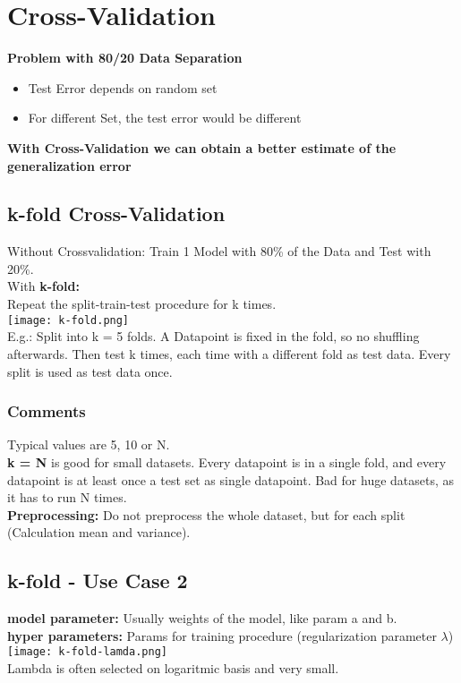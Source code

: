 \section{Cross-Validation}
\textbf{Problem with 80/20 Data Separation}
\begin{itemize}
    \item Test Error depends on random set
    \item For different Set, the test error would be different
\end{itemize}
\textbf{With Cross-Validation we can obtain a better estimate of the generalization error}
\subsection{k-fold Cross-Validation}
Without Crossvalidation: Train 1 Model with 80\% of the Data and Test with 20\%.\\
With \textbf{k-fold:}\\
Repeat the split-train-test procedure for k times.\\
\texttt{[image: k-fold.png]}\\
E.g.: Split into k = 5 folds.
A Datapoint is fixed in the fold, so no shuffling afterwards.
Then test k times, each time with a different fold as test data. 
Every split is used as test data once.
\subsubsection{Comments}
Typical values are 5, 10 or N.\\
\textbf{k = N} is good for small datasets. 
Every datapoint is in a single fold, and every datapoint is at least once a test set as single datapoint.
Bad for huge datasets, as it has to run N times.\\
\textbf{Preprocessing:} Do not preprocess the whole dataset, but for each split (Calculation mean and variance).

\subsection{k-fold - Use Case 2}
\textbf{model parameter:} Usually weights of the model, like param a and b.\\
\textbf{hyper parameters:} Params for training procedure (regularization parameter $\lambda$)\\
\texttt{[image: k-fold-lamda.png]}\\
Lambda is often selected on logaritmic basis and very small.

